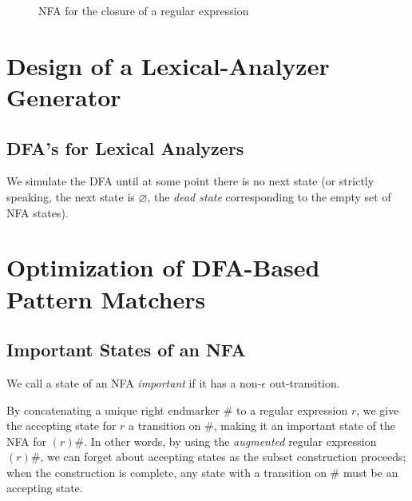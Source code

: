 \documentclass[12pt,a4paper,twoside,openany]{book}
\begin{document}
\begin{figure}[htbp]
    \centering
    \caption{NFA for the closure of a regular expression}
    \label{Figure:3.42}
\end{figure}

\section{Design of a Lexical-Analyzer Generator}
\subsection{DFA's for Lexical Analyzers}

We simulate the DFA until at some point there is no next state (or strictly speaking, the next state is $\varnothing$, the \textit{dead state} corresponding to the empty set of NFA states).

\section{Optimization of DFA-Based Pattern Matchers}
\subsection{Important States of an NFA}

We call a state of an NFA \textit{important} if it has a non-$\epsilon$ out-transition.

By concatenating a unique right endmarker $\#$ to a regular expression $r$, we give the accepting state for $r$ a transition on $\#$, making it an important state of the NFA for $(r)\#$. In other words, by using the \textit{augmented} regular expression $(r)\#$, we can forget about accepting states as the subset construction proceeds; when the construction is complete, any state with a transition on $\#$ must be an accepting state.
\end{document}
